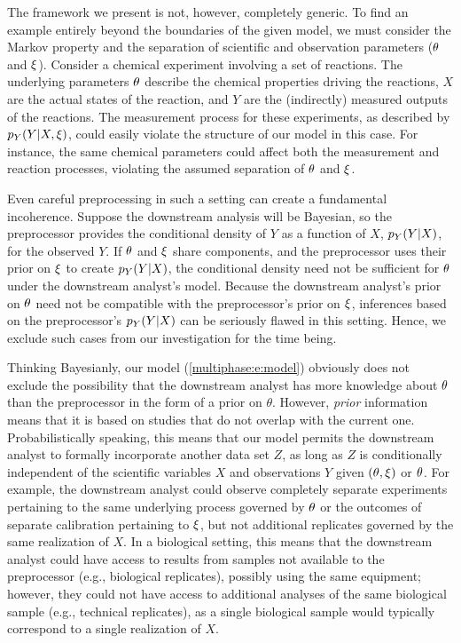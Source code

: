 The framework we present is not, however, completely generic.
To find an example entirely beyond the boundaries of the given model, we must consider the Markov property and the separation of scientific and observation parameters ($\theta$ and $\xi$).
Consider a chemical experiment involving a set of reactions.
The underlying parameters $\theta$ describe the chemical properties driving the reactions, $X$ are the actual states of the reaction, and $Y$ are the (indirectly) measured outputs of the reactions.
The measurement process for these experiments, as described by $p_Y(Y|X, \xi)$, could easily violate the structure of our model in this case.
For instance, the same chemical parameters could affect both the measurement and reaction processes, violating the assumed separation of $\theta$ and $\xi$.

Even careful preprocessing in such a setting can create a fundamental incoherence.
Suppose the downstream analysis will be Bayesian, so the preprocessor provides the conditional density of $Y$ as a function of $X$, $p_Y(Y | X)$,  for the observed $Y$.
If $\theta$ and $\xi$ share components, and the preprocessor uses their prior on $\xi$ to create $p_Y(Y | X)$, the conditional density need not be sufficient for $\theta$ under the downstream analyst's model.
Because the downstream analyst's prior on $\theta$ need not be compatible with the preprocessor's prior on $\xi$, inferences based on the preprocessor's $p_Y(Y | X)$ can be seriously flawed in this setting.
Hence, we exclude such cases from our investigation for the time being.

Thinking Bayesianly, our model  (\ref{multiphase:e:model}) obviously  does not exclude the possibility that the downstream analyst has more knowledge about $\theta$ than the preprocessor in the form of a prior on $\theta$.
However, \textit{prior} information means that it is based on studies that do not overlap with the current one.
Probabilistically  speaking,  this means that our model permits the downstream analyst to formally incorporate  another data set $Z$,  as long as $Z$ is conditionally independent of the scientific variables $X$ and observations $Y$ given $(\theta, \xi)$ or $\theta$.
For example, the downstream analyst could observe completely separate experiments pertaining to the same underlying process governed by $\theta$ or the outcomes of separate calibration pertaining to $\xi$, but not additional replicates governed by the same realization of $X$.
In a biological setting, this means that the downstream analyst could have access to results from samples not available to the preprocessor (e.g., biological replicates), possibly using the same equipment; however, they could not have access to additional analyses of the same biological sample (e.g., technical replicates), as a single biological sample would typically correspond to a single realization of $X$.

